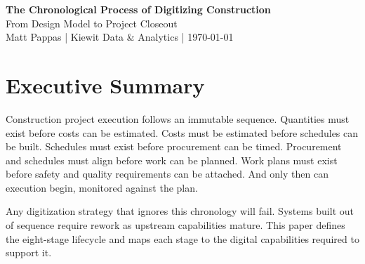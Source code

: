 \documentclass[11pt, letterpaper]{article}
\begin{document}
\begin{center}
{\Large \textbf{The Chronological Process of Digitizing Construction}}\\[0.5em]
{\color{accent}\small From Design Model to Project Closeout}\\[0.3em]
{\small Matt Pappas | Kiewit Data \& Analytics | \today}
\end{center}

\vspace{1.5em}

\section*{Executive Summary}

Construction project execution follows an immutable sequence. Quantities must exist before costs can be estimated. Costs must be estimated before schedules can be built. Schedules must exist before procurement can be timed. Procurement and schedules must align before work can be planned. Work plans must exist before safety and quality requirements can be attached. And only then can execution begin, monitored against the plan.

Any digitization strategy that ignores this chronology will fail. Systems built out of sequence require rework as upstream capabilities mature. This paper defines the eight-stage lifecycle and maps each stage to the digital capabilities required to support it.

\vspace{1em}

\begin{center}
\end{center}
\end{document}
